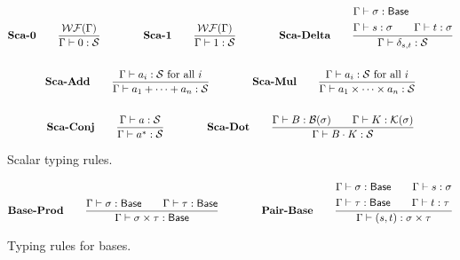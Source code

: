 \documentclass{article}
\begin{document}
\begin{figure}[h]
    \begin{gather*}
        \textbf{Sca-0} \qquad
        \frac{\mathcal{WF}(\Gamma)}{\Gamma \vdash 0 : \mathcal{S}}
        \qquad \qquad
        \textbf{Sca-1} \qquad
        \frac{\mathcal{WF}(\Gamma)}{\Gamma \vdash 1 : \mathcal{S}}
        \qquad \qquad
        \textbf{Sca-Delta} \qquad
        \frac{            
            \begin{aligned}
                & \Gamma\vdash \sigma : \mathsf{Base} \\
                & \Gamma\vdash s : \sigma \qquad \Gamma\vdash t : \sigma
            \end{aligned}} {\Gamma \vdash \delta_{s, t} : \mathcal{S}} \\
        \\
        \textbf{Sca-Add} \qquad
        \frac{\Gamma\vdash a_i : \mathcal{S} \text{ for all $i$}}{\Gamma\vdash a_1 + \cdots + a_n : \mathcal{S}}
        \qquad \qquad
        \textbf{Sca-Mul} \qquad
        \frac{\Gamma\vdash a_i : \mathcal{S} \text{ for all $i$}}{\Gamma\vdash a_1 \times \cdots \times a_n : \mathcal{S}} \\
        \\
        \textbf{Sca-Conj} \qquad
        \frac{\Gamma \vdash a : \mathcal{S}}{\Gamma \vdash a^*:\mathcal{S}}
        \qquad \qquad
        \textbf{Sca-Dot} \qquad
        \frac{\Gamma\vdash B : \mathcal{B}(\sigma) \qquad \Gamma\vdash K : \mathcal{K}(\sigma)}{\Gamma \vdash B \cdot K : \mathcal{S}}
    \end{gather*}
    \caption{Scalar typing rules.}
\end{figure}

\begin{figure}[h]
    \begin{gather*}
        \textbf{Base-Prod} \qquad
        \frac{\Gamma\vdash \sigma : \mathsf{Base} \qquad \Gamma\vdash \tau : \mathsf{Base}}{\Gamma\vdash \sigma \times \tau : \mathsf{Base}}
        \qquad \qquad
        \textbf{Pair-Base} \qquad
        \frac{
            \begin{aligned}
                & \Gamma\vdash \sigma : \mathsf{Base} \qquad \Gamma\vdash s : \sigma \\
                & \Gamma\vdash \tau : \mathsf{Base} \qquad \Gamma\vdash t : \tau
            \end{aligned}} {\Gamma\vdash (s, t) : \sigma \times \tau} 
        \textbf{}
    \end{gather*}
    \caption{Typing rules for bases. }
\end{figure}
\end{document}
